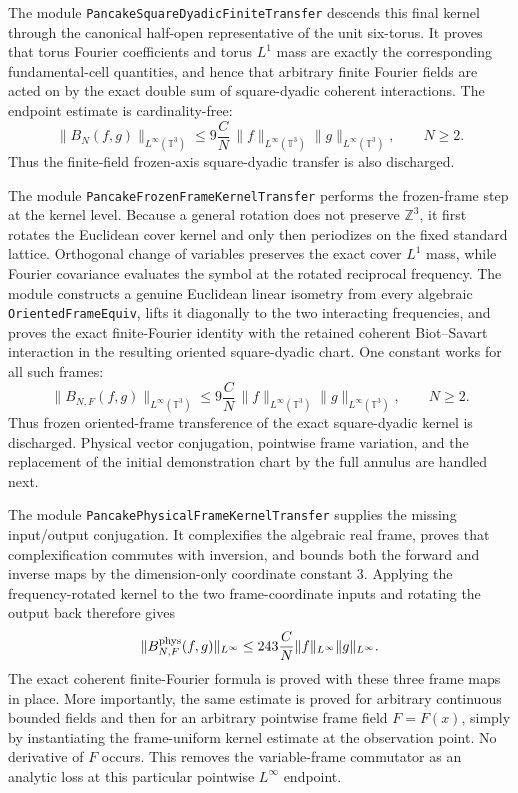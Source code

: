 \documentclass[11pt]{article}
\theoremstyle{definition}
\begin{document}
The module \texttt{PancakeSquareDyadicFiniteTransfer} descends this final
kernel through the canonical half-open representative of the unit six-torus.
It proves that torus Fourier coefficients and torus $L^1$ mass are exactly the
corresponding fundamental-cell quantities, and hence that arbitrary finite
Fourier fields are acted on by the exact double sum of square-dyadic coherent
interactions.  The endpoint estimate is cardinality-free:
\[
 \|B_N(f,g)\|_{L^\infty(\mathbb T^3)}
 \leq 9\frac{C}{N}\,
   \|f\|_{L^\infty(\mathbb T^3)}
   \|g\|_{L^\infty(\mathbb T^3)},\qquad N\geq2.
\]
Thus the finite-field frozen-axis square-dyadic transfer is also discharged.

The module \texttt{PancakeFrozenFrameKernelTransfer} performs the frozen-frame
step at the kernel level.  Because a general rotation does not preserve
$\mathbb Z^3$, it first rotates the Euclidean cover kernel and only then
periodizes on the fixed standard lattice.  Orthogonal change of variables
preserves the exact cover $L^1$ mass, while Fourier covariance evaluates the
symbol at the rotated reciprocal frequency.  The module constructs a genuine
Euclidean linear isometry from every algebraic
\texttt{OrientedFrameEquiv}, lifts it diagonally to the two interacting
frequencies, and proves the exact finite-Fourier identity with the retained
coherent Biot--Savart interaction in the resulting oriented square-dyadic
chart.  One constant works for all such frames:
\[
 \|B_{N,F}(f,g)\|_{L^\infty(\mathbb T^3)}
 \leq 9\frac{C}{N}\,
   \|f\|_{L^\infty(\mathbb T^3)}
   \|g\|_{L^\infty(\mathbb T^3)},
 \qquad N\geq2.
\]
Thus frozen oriented-frame transference of the exact square-dyadic kernel is
discharged.  Physical vector conjugation, pointwise frame variation, and the
replacement of the initial demonstration chart by the full annulus are
handled next.

The module \texttt{PancakePhysicalFrameKernelTransfer} supplies the missing
input/output conjugation.  It complexifies the algebraic real frame, proves
that complexification commutes with inversion, and bounds both the forward and
inverse maps by the dimension-only coordinate constant $3$.  Applying the
frequency-rotated kernel to the two frame-coordinate inputs and rotating the
output back therefore gives
\[
 \|B^{\rm phys}_{N,F}(f,g)\|_{L^\infty}
 \leq 243\frac{C}{N}\|f\|_{L^\infty}\|g\|_{L^\infty}.
\]
The exact coherent finite-Fourier formula is proved with these three frame
maps in place.  More importantly, the same estimate is proved for arbitrary
continuous bounded fields and then for an arbitrary pointwise frame field
$F=F(x)$, simply by instantiating the frame-uniform kernel estimate at the
observation point.  No derivative of $F$ occurs.  This removes the
variable-frame commutator as an analytic loss at this particular pointwise
$L^\infty$ endpoint.
\end{document}
